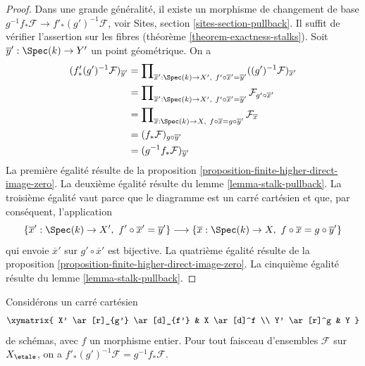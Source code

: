 \begin{proof}
Dans une grande g\'en\'eralit\'e, il existe un morphisme de changement de base
$g^{-1}f_*\mathcal{F} \to f'_*(g')^{-1}\mathcal{F}$, voir
Sites, section \ref{sites-section-pullback}.
Il suffit de v\'erifier l'assertion sur les fibres (th\'eor\`eme \ref{theorem-exactness-stalks}).
Soit $\overline{y}' : \Spec(k) \to Y'$ un point g\'eom\'etrique.
On a
\begin{align*}
(f'_*(g')^{-1}\mathcal{F})_{\overline{y}'}
& =
\prod\nolimits_{\overline{x}' : \Spec(k) \to X',\ f' \circ \overline{x}' =
\overline{y}'}
((g')^{-1}\mathcal{F})_{\overline{x}'} \\
& =
\prod\nolimits_{\overline{x}' : \Spec(k) \to X',\ f' \circ \overline{x}' =
\overline{y}'} \mathcal{F}_{g' \circ \overline{x}'} \\
& =
\prod\nolimits_{\overline{x} : \Spec(k) \to X,\ f \circ \overline{x} =
g \circ \overline{y}'} \mathcal{F}_{\overline{x}} \\
& =
(f_*\mathcal{F})_{g \circ \overline{y}'} \\
& =
(g^{-1}f_*\mathcal{F})_{\overline{y}'}
\end{align*}
La premi\`ere \'egalit\'e r\'esulte de la
proposition \ref{proposition-finite-higher-direct-image-zero}.
La deuxi\`eme \'egalit\'e r\'esulte du
lemme \ref{lemma-stalk-pullback}.
La troisi\`eme \'egalit\'e vaut parce que le diagramme est un carr\'e cart\'esien
et que, par cons\'equent, l'application
$$
\{\overline{x}' : \Spec(k) \to X',\ f' \circ \overline{x}' =
\overline{y}'\}
\longrightarrow
\{\overline{x} : \Spec(k) \to X,\ f \circ \overline{x} =
g \circ \overline{y}'\}
$$
qui envoie $\overline{x}'$ sur $g' \circ \overline{x}'$ est bijective.
La quatri\`eme \'egalit\'e r\'esulte de la
proposition \ref{proposition-finite-higher-direct-image-zero}.
La cinqui\`eme \'egalit\'e r\'esulte du
lemme \ref{lemma-stalk-pullback}.
\end{proof}

\begin{lemma}
\label{lemma-integral-pushforward-commutes-with-base-change}
Consid\'erons un carr\'e cart\'esien
$$
\xymatrix{
X' \ar[r]_{g'} \ar[d]_{f'} & X \ar[d]^f \\
Y' \ar[r]^g & Y
}
$$
de sch\'emas, avec $f$ un morphisme entier.
Pour tout faisceau d'ensembles $\mathcal{F}$ sur $X_\etale$, on a
$f'_*(g')^{-1}\mathcal{F} = g^{-1}f_*\mathcal{F}$.
\end{lemma}

